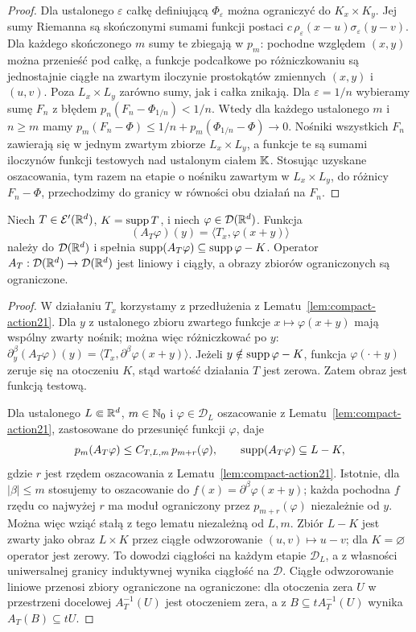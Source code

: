 \begin{proof}
Dla ustalonego $\varepsilon$ całkę definiującą
$\Phi_\varepsilon$ można ograniczyć do $K_x\times K_y$.
Jej sumy Riemanna są skończonymi sumami funkcji postaci
$c\,\rho_\varepsilon(x-u)\sigma_\varepsilon(y-v)$.
Dla każdego skończonego $m$ sumy te zbiegają w $p_m$:
pochodne względem $(x,y)$ można przenieść pod całkę,
a funkcje podcałkowe po różniczkowaniu są jednostajnie
ciągłe na zwartym iloczynie prostokątów zmiennych
$(x,y)$ i $(u,v)$. Poza $L_x\times L_y$ zarówno sumy,
jak i całka znikają. Dla $\varepsilon=1/n$ wybieramy
sumę $F_n$ z błędem $p_n(F_n-\Phi_{1/n})<1/n$.
Wtedy dla każdego ustalonego $m$ i $n\ge m$ mamy
$p_m(F_n-\Phi)\le 1/n+p_m(\Phi_{1/n}-\Phi)\to0$.
Nośniki wszystkich $F_n$ zawierają się w jednym zwartym
zbiorze $L_x\times L_y$, a funkcje te są sumami
iloczynów funkcji testowych nad ustalonym ciałem $\mathbb K$.
Stosując uzyskane oszacowania, tym razem na etapie
o nośniku zawartym w $L_x\times L_y$, do różnicy $F_n-\Phi$,
przechodzimy do granicy w równości obu działań na $F_n$.
\end{proof}

\begin{lemat}
\label{lem:convolution-transpose21}
Niech $T\in\mathcal E'(\mathbb R^d)$, $K=\operatorname{supp} T$, i niech
$\varphi\in\mathcal D(\mathbb R^d)$. Funkcja
\[
 (A_T\varphi)(y)=\langle T_x,\varphi(x+y)\rangle
\]
należy do $\mathcal D(\mathbb R^d)$ i spełnia
$\operatorname{supp}(A_T\varphi)\subseteq\operatorname{supp}\varphi-K$.
Operator $A_T:\mathcal D(\mathbb R^d)\to\mathcal D(\mathbb R^d)$
jest liniowy i ciągły, a obrazy zbiorów ograniczonych
są ograniczone.
\end{lemat}
\begin{proof}
W działaniu $T_x$ korzystamy z przedłużenia z
Lematu~\ref{lem:compact-action21}. Dla $y$ z ustalonego
zbioru zwartego funkcje $x\mapsto\varphi(x+y)$ mają
wspólny zwarty nośnik; można więc różniczkować po $y$:
$\partial_y^\beta(A_T\varphi)(y)=
\langle T_x,\partial^\beta\varphi(x+y)\rangle$.
Jeżeli $y\notin\operatorname{supp}\varphi-K$, funkcja
$\varphi(\cdot+y)$ zeruje się na otoczeniu $K$,
stąd wartość działania $T$ jest zerowa. Zatem obraz
jest funkcją testową.

Dla ustalonego $L\Subset\mathbb R^d$, $m\in\mathbb N_0$ i
$\varphi\in\mathcal D_L$ oszacowanie z
Lematu~\ref{lem:compact-action21}, zastosowane do
przesunięć funkcji $\varphi$, daje
\[
 p_m(A_T\varphi)\le C_{T,L,m}\,p_{m+r}(\varphi),
 \qquad \operatorname{supp}(A_T\varphi)\subseteq L-K,
\]
gdzie $r$ jest rzędem oszacowania z Lematu~\ref{lem:compact-action21}.
Istotnie, dla $|\beta|\le m$ stosujemy to oszacowanie do
$f(x)=\partial^\beta\varphi(x+y)$; każda pochodna $f$
rzędu co najwyżej $r$ ma moduł ograniczony przez
$p_{m+r}(\varphi)$ niezależnie od $y$.
Można więc wziąć stałą z tego lematu niezależną od $L,m$.
Zbiór $L-K$ jest zwarty jako obraz $L\times K$ przez
ciągłe odwzorowanie $(u,v)\mapsto u-v$; dla $K=\varnothing$
operator jest zerowy.
To dowodzi ciągłości na każdym etapie $\mathcal D_L$,
a z własności uniwersalnej granicy induktywnej
wynika ciągłość na $\mathcal D$. Ciągłe odwzorowanie liniowe
przenosi zbiory ograniczone na ograniczone: dla otoczenia
zera $U$ w przestrzeni docelowej $A_T^{-1}(U)$ jest
otoczeniem zera, a z $B\subseteq t A_T^{-1}(U)$
wynika $A_T(B)\subseteq tU$.
\end{proof}

